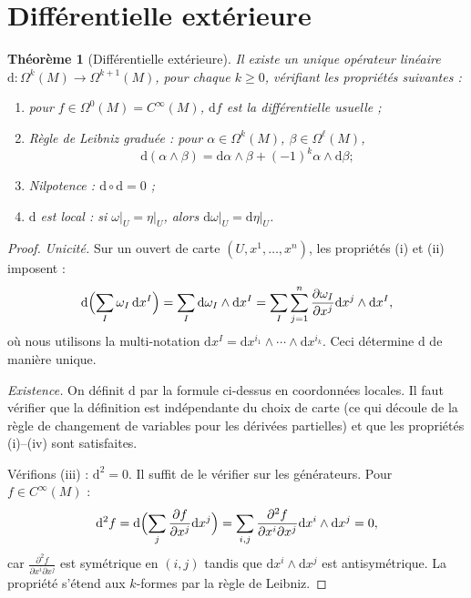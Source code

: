\documentclass[12pt,a4paper,openany]{book}
\theoremstyle{definition}
\theoremstyle{plain}
\newtheorem{theoreme}[definition]{Théorème}
\theoremstyle{remark}
\newcommand{\dd}{\mathrm{d}}
\begin{document}
\section{Différentielle extérieure}\label{sec:differentielle-exterieure}

\begin{theoreme}[Différentielle extérieure]\label{thm:differentielle-exterieure}%
\index{$\dd$}
Il existe un unique opérateur linéaire
$\dd \colon \Omega^k(M) \to \Omega^{k+1}(M)$, pour chaque $k \geq 0$,
vérifiant les propriétés suivantes :
\begin{enumerate}[label=\textup{(\roman*)}]
  \item pour $f \in \Omega^0(M) = C^\infty(M)$, $\dd f$ est la
    différentielle usuelle ;
  \item \emph{Règle de Leibniz graduée :} pour
    $\alpha \in \Omega^k(M)$, $\beta \in \Omega^\ell(M)$,
    \[
      \dd(\alpha \wedge \beta) = \dd\alpha \wedge \beta +
        (-1)^k \alpha \wedge \dd\beta ;
    \]
  \item \emph{Nilpotence :} $\dd \circ \dd = 0$ ;
  \item $\dd$ est local : si $\omega\big|_U = \eta\big|_U$, alors
    $\dd\omega\big|_U = \dd\eta\big|_U$.
\end{enumerate}
\end{theoreme}

\begin{proof}
\emph{Unicité.}
Sur un ouvert de carte $(U, x^1, \ldots, x^n)$, les propriétés (i) et
(ii) imposent :
\[
  \dd\Bigl(\sum_I \omega_I\, \dd x^I\Bigr)
    = \sum_I \dd\omega_I \wedge \dd x^I
    = \sum_I \sum_{j=1}^n \frac{\partial \omega_I}{\partial x^j}
      \dd x^j \wedge \dd x^I,
\]
où nous utilisons la multi-notation $\dd x^I = \dd x^{i_1} \wedge \cdots
\wedge \dd x^{i_k}$. Ceci détermine $\dd$ de manière unique.

\emph{Existence.}
On définit $\dd$ par la formule ci-dessus en coordonnées locales. Il faut
vérifier que la définition est indépendante du choix de carte (ce qui
découle de la règle de changement de variables pour les dérivées
partielles) et que les propriétés (i)--(iv) sont satisfaites.

Vérifions (iii) : $\dd^2 = 0$. Il suffit de le vérifier sur les
générateurs. Pour $f \in C^\infty(M)$ :
\[
  \dd^2 f = \dd\Bigl(\sum_j \frac{\partial f}{\partial x^j}
    \dd x^j\Bigr) = \sum_{i,j} \frac{\partial^2 f}{\partial x^i
    \partial x^j} \dd x^i \wedge \dd x^j = 0,
\]
car $\frac{\partial^2 f}{\partial x^i \partial x^j}$ est symétrique en
$(i,j)$ tandis que $\dd x^i \wedge \dd x^j$ est antisymétrique. La
propriété s'étend aux $k$-formes par la règle de Leibniz.
\end{proof}
\end{document}
